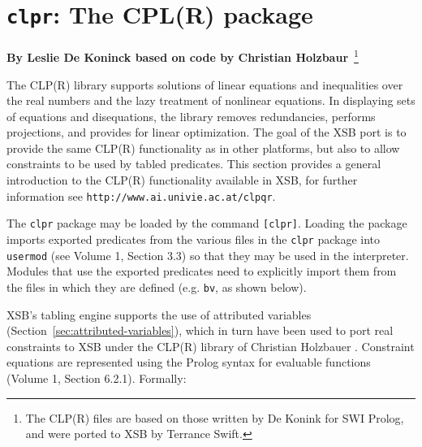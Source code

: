 \chapter{{\tt clpr}: The CPL(R) package}

\begin{center}
{\Large  {\bf By Leslie De Koninck based on code by Christian Holzbaur}}~\footnote{The
  CLP(R) files are based on those written by De Konink for SWI Prolog,
  and were ported to XSB by Terrance Swift.}
\end{center}

The CLP(R) library supports solutions of linear equations and
inequalities over the real numbers and the lazy treatment of
nonlinear equations.  In displaying sets of equations and
disequations, the library removes redundancies, performs projections,
and provides for linear optimization.  The goal of the XSB port is to
provide the same CLP(R) functionality as in other platforms, but also
to allow constraints to be used by tabled predicates.  This section
provides a general introduction to the CLP(R) functionality available
in XSB, for further information see {\tt http://www.ai.univie.ac.at/clpqr}.

The {\tt clpr} package may be loaded by the command {\tt [clpr]}.
Loading the package imports exported predicates from the various files
in the {\tt clpr} package into {\tt usermod} (see Volume 1, Section
3.3) so that they may be used in the interpreter.  Modules that use
the exported predicates need to explicitly import them from the files
in which they are defined (e.g. {\tt bv}, as shown below).

XSB's tabling engine supports the use of attributed variables
(Section~\ref{sec:attributed-variables}), which in turn have been used
to port real constraints to XSB under the CLP(R) library of Christian
Holzbauer \cite{Holz95}.  Constraint equations are represented using
the Prolog syntax for evaluable functions (Volume 1, Section 6.2.1).
Formally:

